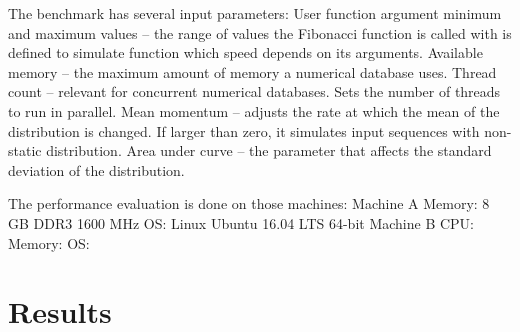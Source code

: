 The benchmark has several input parameters:
User function argument minimum and maximum values – the range of values the Fibonacci function is called with is defined to simulate function which speed depends on its arguments.
Available memory – the maximum amount of memory a numerical database uses.
Thread count – relevant for concurrent numerical databases. Sets the number of  threads to run in parallel.
Mean momentum – adjusts the rate at which the mean of the distribution is changed. If larger than zero, it simulates input sequences with non-static distribution.
Area under curve – the parameter that affects the standard deviation of the distribution.

The performance evaluation is done on those machines:
Machine A
Memory: 8 GB DDR3 1600 MHz
OS: Linux Ubuntu 16.04 LTS 64-bit
Machine B
CPU:
Memory:
OS:

\section{Results}
